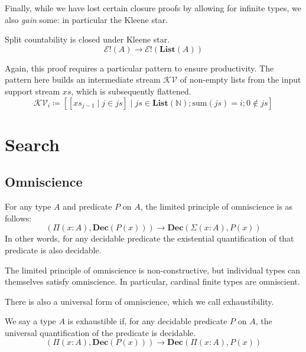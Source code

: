 Finally, while we have lost certain closure proofs by allowing for infinite
types, we also \emph{gain} some: in particular the Kleene star.
\begin{romtheorem}
  Split countability is closed under Kleene star.
  \begin{equation}
    \mathcal{E}!(A) \rightarrow \mathcal{E}!(\mathbf{List}(A))
  \end{equation}
\end{romtheorem}
Again, this proof requires a particular pattern to ensure productivity.
The pattern here builds an intermediate stream \(\mathcal{KV}\) of non-empty
lists from the input support stream \(\mathit{xs}\), which is subsequently
flattened.
\begin{equation}
  \mathcal{KV}_i \coloneqq \left[ \left[ \mathit{xs}_{j - 1} \mid j \in \mathit{js} \right] \mid \mathit{js} \in \mathbf{List}(\mathbb{N}) ; \text{sum}(\mathit{js}) = i ; 0 \notin \mathit{js}  \right]
\end{equation}
\section{Search} \label{search}
\subsection{Omniscience}
\begin{romdefinition}
  For any type \(A\) and predicate \(P\) on \(A\), the limited principle of
  omniscience \cite{myhillErrettBishopFoundations1972} is as follows:
  \begin{equation}
    \left( \Pi {(x : A)} , \mathbf{Dec}(P(x)) \right) \rightarrow \mathbf{Dec} \left( \Sigma {(x : A)} , P(x) \right)
  \end{equation}
  In other words, for any decidable predicate the existential quantification of
  that predicate is also decidable.
\end{romdefinition}
The limited principle of omniscience is non-constructive, but individual types
can themselves satisfy omniscience.
In particular, cardinal finite types are omniscient.

There is also a universal form of omniscience, which we call exhaustibility.
\begin{romdefinition}[Exhaustibility]
  We say a type \(A\) is exhaustible if, for any decidable predicate \(P\) on
  \(A\), the universal quantification of the predicate is decidable.
  \begin{equation}
    \left( \Pi {(x : A)} , \mathbf{Dec}(P(x)) \right) \rightarrow \mathbf{Dec} \left( \Pi {(x : A)} , P(x) \right)
  \end{equation}
\end{romdefinition}

